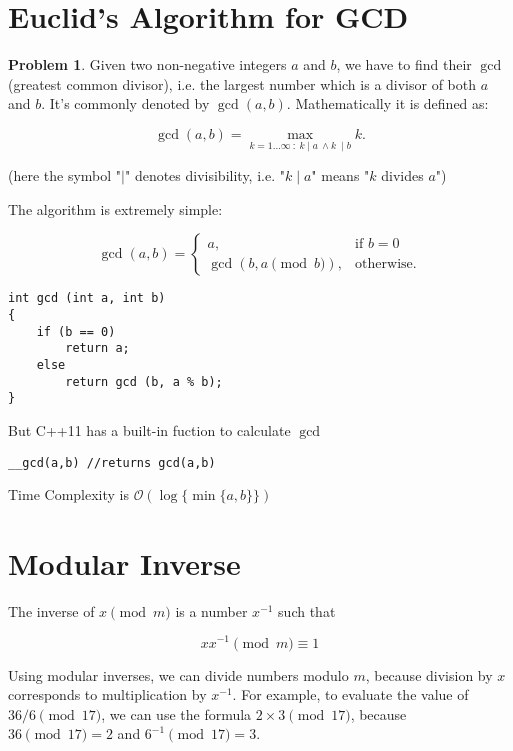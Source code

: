 \documentclass[twoside,12pt,a4paper,english]{book}
\theoremstyle{definition}
\theoremstyle{problemstyle}
\newtheorem*{problem}{Problem} %
\theoremstyle{problemstyle}
\theoremstyle{problemstyle}
\begin{document}
\section{Euclid's Algorithm for GCD}
\begin{problem}
Given two non-negative integers $a$ and $b$, we have to find their $\gcd$(greatest common divisor), i.e. the largest number which is a divisor of both $a$ and $b$. It's commonly denoted by $\gcd(a,b)$. Mathematically it is defined as:

$$\gcd(a, b) = \max_ {k = 1 \dots \infty ~ : ~ k \mid a ~ \wedge k ~ \mid b} k.$$

(here the symbol "$\mid$" denotes divisibility, i.e. "$k\mid a$" means "$k$ divides $a$")
\end{problem}

\begin{tcolorbox}[title=Solution]

The algorithm is extremely simple:

$$\gcd(a, b) = \begin{cases}a,&\text{if }b = 0 \\ \gcd(b, a \pmod{b}),&\text{otherwise.}\end{cases}$$

\begin{lstlisting}
int gcd (int a, int b) 
{
    if (b == 0)
        return a;
    else
        return gcd (b, a % b);
}
\end{lstlisting}

But C++11 has a built-in fuction to calculate $\gcd$

\begin{lstlisting}
__gcd(a,b) //returns gcd(a,b)
\end{lstlisting}

Time Complexity is $\mathcal{O}(\log\{\min\{a,b\}\})$
\end{tcolorbox}
\newpage
\section{Modular Inverse}

The inverse of $x \pmod m$ is a number $x^{-1}$ such that

$$xx^{-1} \pmod{m} \equiv 1$$

Using modular inverses, we can divide numbers modulo $m$, because division by $x$ corresponds to multiplication by $x^{-1}$. For example, to evaluate the value of $36/6 \pmod{17}$, we can use the formula $2 \times 3 \pmod{17}$, because $36 \pmod{17} = 2$ and $6^{-1} \pmod{17} = 3$.
\end{document}
